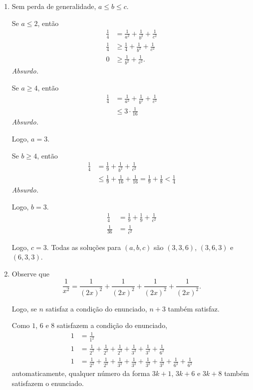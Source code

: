 \begin{enumerate}[label = (\alph*)]
	\item
		Sem perda de generalidade, $a \le b \le c$.

		Se $a \le 2$, então 
		\begin{align*}
			\frac{1}{4} &= \frac{1}{a^2} + \frac{1}{b^2} + \frac{1}{c^2}\\
			\frac{1}{4} &\ge \frac{1}{4} + \frac{1}{b^2} + \frac{1}{c^2}\\
			0			&\ge \frac{1}{b^2} + \frac{1}{c^2}.
		\end{align*}
		\hfill \textit{Absurdo.}

		Se $a \ge 4$, então
		\begin{align*}
			\frac{1}{4} &= \frac{1}{a^2} + \frac{1}{b^2} + \frac{1}{c^2}\\
						&\le 3\cdot\frac{1}{16}
		\end{align*}
		\hfill \textit{Absurdo.}

		Logo, $a = 3$.

		Se $b \ge 4$, então
		\begin{align*}
			\frac{1}{4} &= \frac{1}{9} + \frac{1}{b^2} + \frac{1}{c^2}\\
						&\le \frac{1}{9} + \frac{1}{16} + \frac{1}{16} = \frac{1}{9} + \frac{1}{8} < \frac{1}{4}
		\end{align*}
		\hfill \textit{Absurdo.}

		Logo, $b = 3$.
		\begin{align*}
			\frac{1}{4} &= \frac{1}{9} + \frac{1}{9} + \frac{1}{c^2}\\
			\frac{1}{36}&= \frac{1}{c^2}
		\end{align*}

		Logo, $c = 3$. Todas as soluções para $(a, b, c)$ são $(3, 3, 6)$, $(3, 6, 3)$ e $(6, 3, 3)$.

	\item Observe que
		\[\frac{1}{x^2} = \frac{1}{(2x)^2} + \frac{1}{(2x)^2} + \frac{1}{(2x)^2} + \frac{1}{(2x)^2}.\] 

		Logo, se $n$ satisfaz a condição do enunciado, $n+3$ também satisfaz.

		Como $1$, $6$ e $8$ satisfazem a condição do enunciado,
		\begin{align*}
			1 &= \frac{1}{1^2}\\
			1 &= \frac{1}{2^2} + \frac{1}{2^2} + \frac{1}{2^2} + \frac{1}{3^2} + \frac{1}{3^2} + \frac{1}{6^2}\\
			1 &= \frac{1}{2^2} + \frac{1}{2^2} + \frac{1}{3^2} + \frac{1}{3^2} + \frac{1}{3^2} + \frac{1}{3^2} + \frac{1}{6^2} + \frac{1}{6^2}
		\end{align*}
		automaticamente, qualquer número da forma $3k+1$, $3k+6$ e $3k+8$ também satisfazem o enunciado.\


\end{enumerate}
